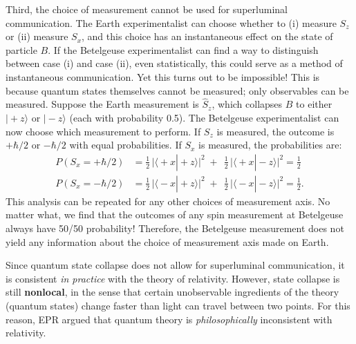\documentclass[pra,11pt]{revtex4}
\begin{document}
Third, the choice of measurement cannot be used for superluminal
communication.  The Earth experimentalist can choose whether to (i)
measure $S_z$ or (ii) measure $S_x$, and this choice has an
instantaneous effect on the state of particle $B$.  If the Betelgeuse
experimentalist can find a way to distinguish between case (i) and
case (ii), even statistically, this could serve as a method of
instantaneous communication.  Yet this turns out to be impossible!
This is because quantum states themselves cannot be measured; only
observables can be measured.  Suppose the Earth measurement is
$\hat{S}_z$, which collapses $B$ to either $|\!+\!z\rangle$ or
$|\!-\!z\rangle$ (each with probability 0.5).  The Betelgeuse
experimentalist can now choose which measurement to perform.  If $S_z$
is measured, the outcome is $+\hbar/2$ or $-\hbar/2$ with equal
probabilities.  If $S_x$ is measured, the probabilities are:
$$\begin{aligned}P(S_x = +\hbar/2) &= \frac{1}{2}\, \Big|\langle\!+x|\!+\!z\rangle\Big|^2 \;+\;\, \frac{1}{2}\, \Big|\langle\!+x|\!-\!z\rangle\Big|^2 = \frac{1}{2}\\P(S_x = -\hbar/2) &= \frac{1}{2}\, \Big|\langle\!-x|\!+\!z\rangle\Big|^2 \;+\;\, \frac{1}{2}\, \Big|\langle\!-x|\!-\!z\rangle\Big|^2 = \frac{1}{2}.\end{aligned}$$
This analysis can be repeated for any other choices of measurement
axis.  No matter what, we find that the outcomes of any spin
measurement at Betelgeuse always have 50/50 probability!  Therefore,
the Betelgeuse measurement does not yield any information about the
choice of measurement axis made on Earth.

Since quantum state collapse does not allow for superluminal
communication, it is consistent \textit{in practice} with the theory
of relativity.  However, state collapse is still \textbf{nonlocal}, in
the sense that certain unobservable ingredients of the theory (quantum
states) change faster than light can travel between two points.  For
this reason, EPR argued that quantum theory is
\textit{philosophically} inconsistent with relativity.
\end{document}

